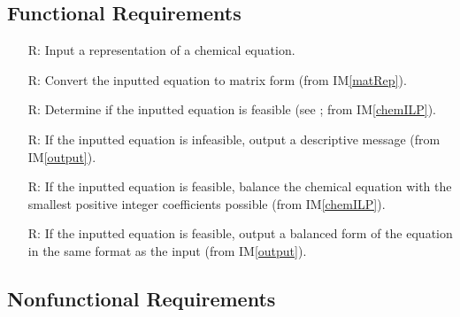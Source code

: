 \documentclass[12pt]{article}
\newcommand{\imref}[1]{IM\ref{#1}}
\newcounter{reqnum} %
\begin{document}
\subsection{Functional Requirements} \label{sec_funcReqs}

\begin{itemize}

  \item[R\refstepcounter{reqnum}\thereqnum \label{R_input}:] Input a
    representation of a chemical equation.

  \item[R\refstepcounter{reqnum}\thereqnum \label{R_convert}:] Convert the
    inputted equation to matrix form (from \imref{matRep}).

  \item[R\refstepcounter{reqnum}\thereqnum \label{R_feasible}:] Determine if the
    inputted equation is feasible (see ;	from
    \imref{chemILP}).

  \item[R\refstepcounter{reqnum}\thereqnum \label{R_infeasOutput}:] If the
    inputted equation is infeasible, output a descriptive message (from
    \imref{output}).

  \item[R\refstepcounter{reqnum}\thereqnum \label{R_balance}:] If the
    inputted equation is feasible, balance the chemical equation with the smallest
    positive integer coefficients possible (from \imref{chemILP}).

  \item[R\refstepcounter{reqnum}\thereqnum \label{R_feasOutput}:] If the
    inputted equation is feasible, output a balanced form of the equation in the
    same format as the input (from \imref{output}).

\end{itemize}


\subsection{Nonfunctional Requirements} \label{sec_nonfuncReqs}
\end{document}
